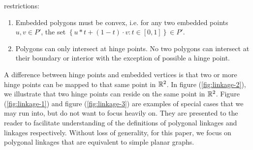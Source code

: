 restrictions:
\begin{enumerate}
\item Embedded polygons must be convex, i.e. for any two embedded points $u,v \in P'$, the set 
$\left\lbrace u * t + (1-t) \cdot v : t \in [0,1] \right\rbrace \in P'$.  
 \item  Polygons can only intersect at hinge points.  No two polygons can intersect at 
their boundary or interior with the exception of possible a hinge point.  
\end{enumerate}

A difference between hinge points and embedded vertices is that two or more hinge points can be 
mapped to that same point in ${\mathbb{R}}^2$.  In figure (\ref{fig:linkage-2}), we illustrate that two 
hinge points can reside on the same point 
in ${\mathbb{R}}^2$. Figure (\ref{fig:linkage-1}) and figure (\ref{fig:linkage-3}) are examples of special 
cases that we may run into, but do not want to focus heavily on.  They are presented to the reader 
to facilitate understanding of the definitions of polygonal linkages and linkages respectively.  
Without loss of generality, for this paper, we focus on polygonal linkages that are 
equivalent to simple planar graphs.
